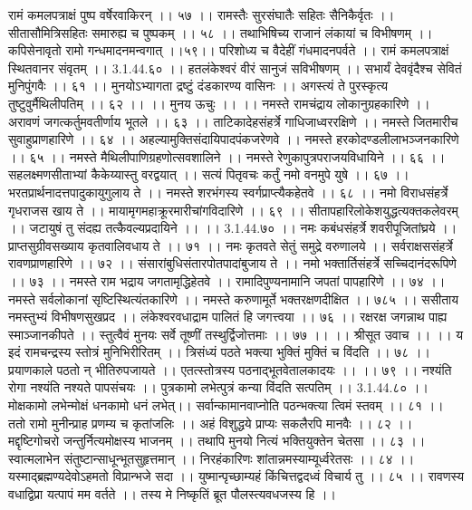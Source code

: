 रामं कमलपत्राक्षं पुष्प वर्षेरवाकिरन् ।। ५७ ।।
रामस्तैः सुरसंघातैः सहितः सैनिकैर्वृतः ।।
सीतासौमित्रिसहितः समारुह्य च पुष्पकम् ।। ५८ ।।
तथाभिषिच्य राजानं लंकायां च विभीषणम् ।।
कपिसेनावृतो रामो गन्धमादनमन्वगात् ।।५९।।
परिशोध्य च वैदेहीं गंधमादनपर्वते ।।
रामं कमलपत्राक्षं स्थितवानर संवृतम् ।। 3.1.44.६० ।।
हतलंकेश्वरं वीरं सानुजं सविभीषणम् ।।
सभार्यं देववृंदैश्च सेवितं मुनिपुंगवैः ।। ६१ ।।
मुनयोऽभ्यागता द्रष्टुं दंडकारण्य वासिनः ।।
अगस्त्यं ते पुरस्कृत्य तुष्टुवुर्मैथिलीपतिम् ।। ६२ ।।
।। मुनय ऊचुः ।। ।।
नमस्ते रामचंद्राय लोकानुग्रहकारिणे ।।
अरावणं जगत्कर्तुमवतीर्णाय भूतले ।। ६३ ।।
ताटिकादेहसंहर्त्रे गाधिजाध्वररक्षिणे ।।
नमस्ते जितमारीच सुवाहुप्राणहारिणे ।। ६४ ।।
अहल्यामुक्तिसंदायिपादपंकजरेणवे ।।
नमस्ते हरकोदण्डलीलाभञ्जनकारिणे ।। ६५ ।।
नमस्ते मैथिलीपाणिग्रहणोत्सवशालिने ।।
नमस्ते रेणुकापुत्रपराजयविधायिने ।। ६६ ।।
सहलक्ष्मणसीताभ्यां कैकेय्यास्तु वरद्वयात् ।।
सत्यं पितृवचः कर्तुं नमो वनमुपे युषे ।। ६७ ।।
भरतप्रार्थनादत्तपादुकायुगुलाय ते ।।
नमस्ते शरभंगस्य स्वर्गप्राप्त्यैकहेतवे ।। ६८ ।।
नमो विराधसंहर्त्रे गृधराजस खाय ते ।।
मायामृगमहाक्रूरमारीचांगविदारिणे ।। ६९ ।।
सीतापहारिलोकेशयुद्धत्यक्तकलेवरम् ।।
जटायुषं तु संदह्य तत्कैवल्यप्रदायिने ।। ।। 3.1.44.७० ।।
नमः कबंधसंहर्त्रे शवरीपूजितांघ्रये ।।
प्राप्तसुग्रीवसख्याय कृतवालिवधाय ते ।। ७१ ।।
नमः कृतवते सेतुं समुद्रे वरुणालये ।।
सर्वराक्षससंहर्त्रे रावणप्राणहारिणे ।। ७२ ।।
संसारांबुधिसंतारपोतपादांबुजाय ते ।।
नमो भक्तार्तिसंहर्त्रे सच्चिदानंदरूपिणे ।। ७३ ।।
नमस्ते राम भद्राय जगतामृद्धिहेतवे ।।
रामादिपुण्यनामानि जपतां पापहारिणे ।। ७४ ।।
नमस्ते सर्वलोकानां सृष्टिस्थित्यंतकारिणे ।।
नमस्ते करुणामूर्ते भक्तरक्षणदीक्षित ।। ७८५ ।।
ससीताय नमस्तुभ्यं विभीषणसुखप्रद ।।
लंकेश्वरवधाद्राम पालितं हि जगत्त्वया ।। ७६ ।।
रक्षरक्ष जगन्नाथ पाह्य स्माञ्जानकीपते ।।
स्तुत्वैवं मुनयः सर्वे तूष्णीं तस्थुर्द्विजोत्तमाः ।। ७७ ।।
।। श्रीसूत उवाच ।। ।।
य इदं रामचन्द्रस्य स्तोत्रं मुनिभिरीरितम् ।।
त्रिसंध्यं पठते भक्त्या भुक्तिं मुक्तिं च विंदति ।। ७८ ।।
प्रयाणकाले पठतो न् भीतिरुपजायते ।।
एतत्स्तोत्रस्य पठनाद्भूतवेतालकादयः ।। ।। ७९ ।।
नश्यंति रोगा नश्यंति नश्यते पापसंचयः ।।
पुत्रकामो लभेत्पुत्रं कन्या विंदति सत्पतिम् ।। 3.1.44.८० ।।
मोक्षकामो लभेन्मोक्षं धनकामो धनं लभेत्।।
सर्वान्कामानवाप्नोति पठन्भक्त्या त्विमं स्तवम् ।। ८१ ।।
ततो रामो मुनीन्प्राह प्रणम्य च कृतांजलिः ।।
अहं विशुद्धये प्राप्यः सकलैरपि मानवैः ।। ८२ ।।
मद्दृष्टिगोचरो जन्तुर्नित्यमोक्षस्य भाजनम् ।।
तथापि मुनयो नित्यं भक्तियुक्तेन चेतसा ।। ८३ ।।
स्वात्मलाभेन संतुष्टान्साधून्भूतसुहृत्तमान् ।।
निरहंकारिणः शांतान्नमस्याम्यूर्ध्वरेतसः ।। ८४ ।।
यस्माद्ब्रह्मण्यदेवोऽहमतो विप्रान्भजे सदा ।।
युष्मान्पृच्छाम्यहं किंचित्तद्वदध्वं विचार्य तु ।। ८५ ।।
रावणस्य वधाद्विप्रा यत्पापं मम वर्तते ।।
तस्य मे निष्कृतिं ब्रूत पौलस्त्यवधजस्य हि ।।
